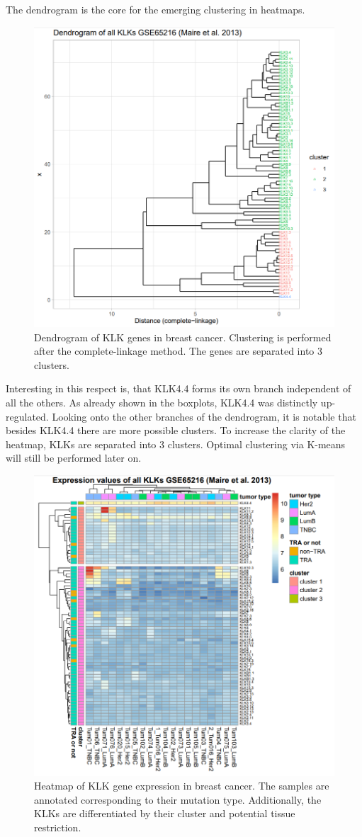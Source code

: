 \documentclass[
]{article}
\begin{document}
The dendrogram is the core for the emerging clustering in heatmaps.

\begin{figure}

{\centering \includegraphics[width=0.5\linewidth]{images/Dendrogram_breast} 

}

\caption{Dendrogram of KLK genes in breast cancer. Clustering is performed after the complete-linkage method. The genes are separated into 3 clusters.}\label{fig:Dendrogram - breast }
\end{figure}

Interesting in this respect is, that KLK4.4 forms its own branch
independent of all the others. As already shown in the boxplots, KLK4.4
was distinctly up-regulated. Looking onto the other branches of the
dendrogram, it is notable that besides KLK4.4 there are more possible
clusters. To increase the clarity of the heatmap, KLKs are separated
into 3 clusters. Optimal clustering via K-means will still be performed
later on.\\

\begin{figure}

{\centering \includegraphics[width=0.5\linewidth]{images/Heatmap_breast} 

}

\caption{Heatmap of KLK gene expression in breast cancer. The samples are annotated corresponding to their mutation type. Additionally, the KLKs are differentiated by their cluster and potential tissue restriction.}\label{fig:Heatmap - breast }
\end{figure}
\end{document}
